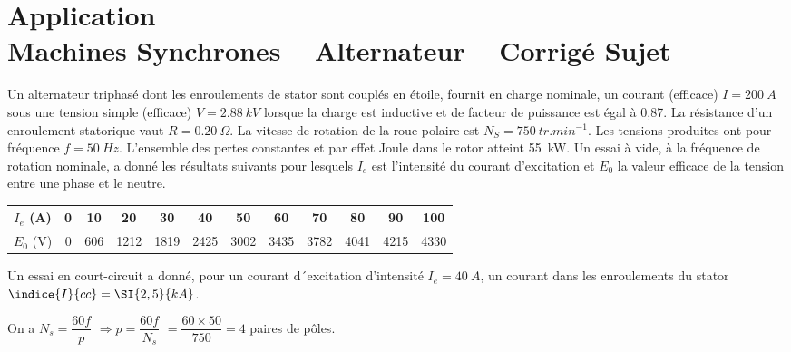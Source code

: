 \chapter*{Application  \\ 
Machines Synchrones -- Alternateur
-- \ifprof Corrigé \else Sujet \fi}

\iflivret {} \else
\ifprof  {} \else \fi
\fi

\setcounter{question}{0}


Un alternateur triphasé dont les enroulements de stator sont couplés en étoile, fournit en charge nominale, un courant (efficace) $I = \SI{200}{A}$ sous une tension simple (efficace) $V = \SI{2,88}{kV}$ lorsque la charge est inductive et de facteur de puissance est égal à 0,87. 
La résistance d’un enroulement statorique vaut $R = \SI{0,20}{\Omega}$. 
La vitesse de rotation de la roue polaire est $N_S = \SI{750}{tr.min^{-1}}$.
Les tensions produites ont pour fréquence $f = \SI{50}{Hz}$. 
L’ensemble des pertes constantes et par effet Joule dans le rotor atteint \SI{55}{kW}. 
Un essai à vide, à la fréquence de rotation nominale, a donné les résultats suivants pour lesquels $I_e$ est l’intensité du courant d’excitation et $E_0$ la valeur efficace de la tension entre une phase et le neutre.


\begin{center}
\begin{tabular}{*{12}{c}}
\hline
$I_e$ (\si{A}) 	& 0	&10	& 20	& 30	& 40	& 50	& 60	& 70	& 80	& 90	& 100	\\
\hline
$E_0$ (\si{V})	& 0	& 606	& 1212	& 1819	& 2425	& 3002	& 3435	& 3782	& 4041	& 4215	& 4330	\\
\hline
\end{tabular}
\end{center}

Un essai en court-circuit a donné, pour un courant d´excitation d’intensité $I_e=\SI{40}{A}$, un courant dans les enroulements du stator $\indice{I}{cc}=\SI{2,5}{kA}$.

\ifprof
\begin{corrige}
On a $N_s = \dfrac{60f}{p}$ $\Rightarrow p = \dfrac{60f}{N_s}$ $=\dfrac{60\times 50}{750}=4$ paires de pôles.

\end{corrige}
\else
\fi

